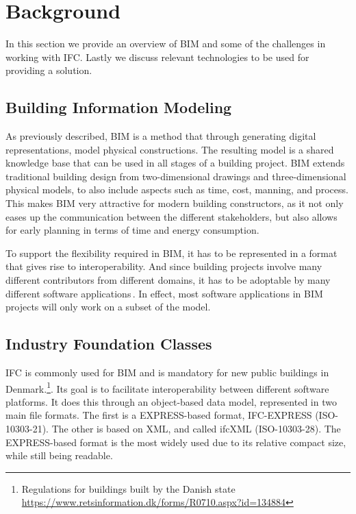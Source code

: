 \section{Background}
\label{sec:background}
In this section we provide an overview of BIM and some of the challenges in working with IFC. Lastly we discuss relevant technologies to be used for providing a solution.
\subsection{Building Information Modeling}
\label{sec:building_information_modeling}
As previously described, BIM is a method that through generating digital representations, model physical constructions. The resulting model is a shared knowledge base that can be used in all stages of a building project. BIM extends traditional building design from two-dimensional drawings and three-dimensional physical models, to also include aspects such as time, cost, manning, and process. This makes BIM very attractive for modern building constructors, as it not only eases up the communication between the different stakeholders, but also allows for early planning in terms of time and energy consumption.

To support the flexibility required in BIM, it has to be represented in a format that gives rise to interoperability. And since building projects involve many different contributors from different domains, it has to be adoptable by many different software applications\,\cite{quteprints37725}. In effect, most software applications in BIM projects will only work on a subset of the model.

\subsection{Industry Foundation Classes}
\label{sec:industry_foundation_classes}
IFC is commonly used for BIM and is mandatory for new public buildings in Denmark.\footnote{Regulations for buildings built by the Danish state \url{https://www.retsinformation.dk/forms/R0710.aspx?id=134884}}. Its goal is to facilitate interoperability between different software platforms. It does this through an object-based data model, represented in two main file formats. The first is a EXPRESS-based format, IFC-EXPRESS (ISO-10303-21). The other is based on XML, and called ifcXML (ISO-10303-28). The EXPRESS-based format is the most widely used due to its relative compact size, while still being readable.

